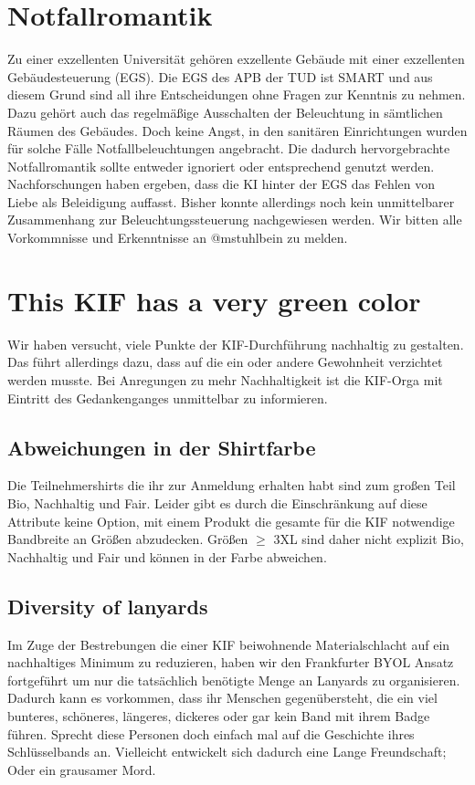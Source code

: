 \section*{Notfallromantik}
Zu einer exzellenten Universität gehören exzellente Gebäude mit einer exzellenten Gebäudesteuerung (EGS).
Die EGS des APB der TUD ist SMART und aus diesem Grund sind all ihre Entscheidungen ohne Fragen zur Kenntnis zu nehmen.
Dazu gehört auch das regelmäßige Ausschalten der Beleuchtung in sämtlichen Räumen des Gebäudes.
Doch keine Angst, in den sanitären Einrichtungen wurden für solche Fälle Notfallbeleuchtungen angebracht.
Die dadurch hervorgebrachte Notfallromantik sollte entweder ignoriert oder entsprechend genutzt werden.
Nachforschungen haben ergeben, dass die KI hinter der EGS das Fehlen von Liebe als Beleidigung auffasst.
Bisher konnte allerdings noch kein unmittelbarer Zusammenhang zur Beleuchtungssteuerung nachgewiesen werden.
Wir bitten alle Vorkommnisse und Erkenntnisse an @mstuhlbein zu melden.

\section*{This KIF has a very green color}
Wir haben versucht, viele Punkte der KIF-Durchführung nachhaltig zu gestalten.
Das führt allerdings dazu, dass auf die ein oder andere Gewohnheit verzichtet werden musste.
Bei Anregungen zu mehr Nachhaltigkeit ist die KIF-Orga mit Eintritt des Gedankenganges unmittelbar zu informieren.

\subsection*{Abweichungen in der Shirtfarbe}
Die Teilnehmershirts die ihr zur Anmeldung erhalten habt sind zum großen Teil Bio, Nachhaltig und Fair.
Leider gibt es durch die Einschränkung auf diese Attribute keine Option, mit einem Produkt die gesamte für die KIF notwendige Bandbreite an Größen abzudecken.
Größen $\geq$ 3XL sind daher nicht explizit Bio, Nachhaltig und Fair und können in der Farbe abweichen.

\subsection*{Diversity of lanyards}
Im Zuge der Bestrebungen die einer KIF beiwohnende Materialschlacht auf ein nachhaltiges Minimum zu reduzieren, haben wir den Frankfurter BYOL Ansatz fortgeführt um nur die tatsächlich benötigte Menge an Lanyards zu organisieren.
Dadurch kann es vorkommen, dass ihr Menschen gegenübersteht, die ein viel bunteres, schöneres, längeres, dickeres oder gar kein Band mit ihrem Badge führen.
Sprecht diese Personen doch einfach mal auf die Geschichte ihres Schlüsselbands an.
Vielleicht entwickelt sich dadurch eine Lange Freundschaft; Oder ein grausamer Mord.

